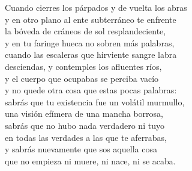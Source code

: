 

Cuando cierres los párpados y de vuelta los abras\\
y en otro plano al ente subterráneo te enfrente\\
la bóveda de cráneos de sol resplandeciente,\\
y en tu faringe hueca no sobren más palabras,\\
cuando las escaleras que hirviente sangre labra\\
desciendas, y contemples los afluentes ríos,\\
y el cuerpo que ocupabas se perciba vacío\\
y no quede otra cosa que estas pocas palabras:\\
sabrás que tu existencia fue un volátil murmullo,\\
una visión efímera de una mancha borrosa,\\
sabrás que no hubo nada verdadero ni tuyo\\
en todas las verdades a las que te aferrabas,\\
y sabrás nuevamente que sos aquella cosa\\
que no empieza ni muere, ni nace, ni se acaba.\\

